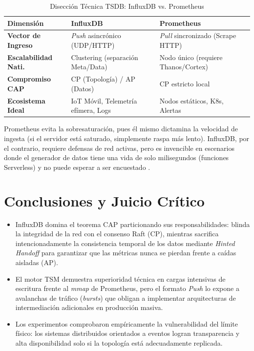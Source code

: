 \documentclass[12pt,a4paper]{article}
\begin{document}
\begin{table}[htbp]
    \centering
    \caption{Disección Técnica TSDB: InfluxDB vs. Prometheus}
    \begin{tabular}{@{}p{3.8cm} p{5.5cm} p{5.5cm}@{}}
        \toprule
        \textbf{Dimensión} & \textbf{InfluxDB} & \textbf{Prometheus} \\ \midrule
        \textbf{Vector de Ingreso} & \textit{Push} asincrónico (UDP/HTTP) & \textit{Pull} sincronizado (Scrape HTTP)\\
        \textbf{Escalabilidad Nati.}& Clustering (separación Meta/Data) & Nodo único (requiere Thanos/Cortex)\\
        \textbf{Compromiso CAP} & CP (Topología) / AP (Datos) & CP estricto local \\
        \textbf{Ecosistema Ideal} & IoT Móvil, Telemetría efímera, Logs & Nodos estáticos, K8s, Alertas \\
        \bottomrule
    \end{tabular}
\end{table}

Prometheus evita la sobresaturación, pues él mismo dictamina la velocidad de ingesta (si el servidor está saturado, simplemente raspa más lento). InfluxDB, por el contrario, requiere defensas de red activas, pero es invencible en escenarios donde el generador de datos tiene una vida de solo milisegundos (funciones Serverless) y no puede esperar a ser encuestado \cite{kopp2025}.

\section{Conclusiones y Juicio Crítico}
\begin{itemize}
    \item InfluxDB domina el teorema CAP particionando sus responsabilidades: blinda la integridad de la red con el consenso Raft (CP), mientras sacrifica intencionadamente la consistencia temporal de los datos mediante \textit{Hinted Handoff} para garantizar que las métricas nunca se pierdan frente a caídas aisladas (AP).
    \item El motor TSM demuestra superioridad técnica en cargas intensivas de escritura frente al \textit{mmap} de Prometheus, pero el formato \textit{Push} lo expone a avalanchas de tráfico (\textit{bursts}) que obligan a implementar arquitecturas de intermediación adicionales en producción masiva.
    \item Los experimentos comprobaron empíricamente la vulnerabilidad del límite físico: los sistemas distribuidos orientados a eventos logran transparencia y alta disponibilidad solo si la topología está adecuadamente replicada.
\end{itemize}
\end{document}
